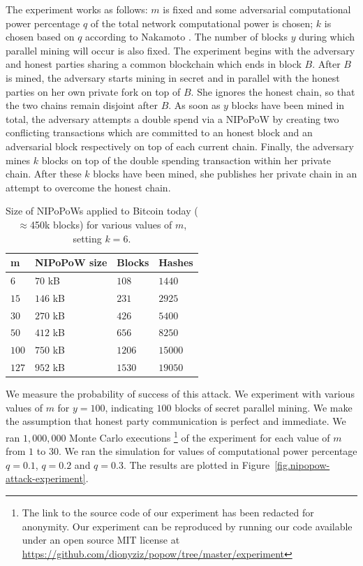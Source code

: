 The experiment works as follows: $m$ is fixed and some adversarial computational
power percentage $q$ of the total network computational power is chosen; $k$ is
chosen based on $q$ according to Nakamoto \cite{bitcoin}. The number of blocks
$y$ during which parallel mining will occur is also fixed. The experiment begins
with the adversary and honest parties sharing a common blockchain which ends in
block $B$. After $B$ is mined, the adversary starts mining in secret and in
parallel with the honest parties on her own private fork on top of $B$. She
ignores the honest chain, so that the two chains remain disjoint after $B$. As
soon as $y$ blocks have been mined in total, the adversary attempts a double
spend via a NIPoPoW
by creating two conflicting transactions which are committed to an honest
block and an adversarial block respectively on top of each current chain.
Finally, the adversary mines $k$ blocks on top of the double spending
transaction within her private chain. After these $k$ blocks have been mined,
she publishes her private chain in an attempt to overcome the honest chain.


\begin{table}
  \caption{
    \label{table.size}
    Size of NIPoPoWs applied to Bitcoin today
    ($\approx$450k blocks) for various values of $m$,
    setting $k = 6$.
  }
  \centering
  \begin{tabular}{l|l|l|l}
      {\bf m}  & {\bf NIPoPoW size} & {\bf Blocks} & {\bf
      Hashes}\\
      \hline
      $6$   & $70$  kB & $108$ & $1440$  \\
      $15$  & $146$ kB & $231$ & $2925$  \\
      $30$  & $270$ kB & $426$ & $5400$  \\
      $50$  & $412$ kB & $656$ & $8250$ \\
      $100$ & $750$ kB & $1206$ & $15000$ \\
      $127$ & $952$ kB & $1530$ & $19050$ \\
  \end{tabular}
\end{table}



We measure the probability of success of this attack. We experiment with various
values of $m$ for $y = 100$, indicating $100$ blocks of secret parallel mining.
We make the assumption that honest party communication is perfect and immediate.
We ran $1,000,000$ Monte Carlo executions
\footnote{
\ifanonymous
The link to the source code of our experiment has been redacted for anonymity.
\else
Our experiment can be reproduced by running our code available under
an open source MIT license at
\url{https://github.com/dionyziz/popow/tree/master/experiment}
\fi
}
of the experiment for each value
of $m$ from $1$ to $30$. We ran the simulation for values of computational power
percentage $q = 0.1$, $q = 0.2$ and $q = 0.3$. The results are plotted in
Figure~\ref{fig.nipopow-attack-experiment}.

